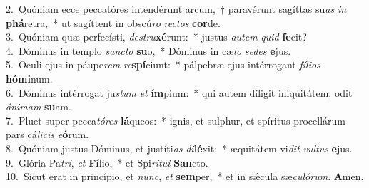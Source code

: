 {2.~}Quóniam ecce peccatóres intendérunt arcum,~† paravérunt sagíttas su\textit{as} \textit{in} \textbf{phá}retra,~* ut sagíttent in obscú\textit{ro} \textit{re}\textit{ctos} \textbf{cor}de.\\
{3.~}Quóniam quæ perfecísti, \textit{de}\textit{stru}\textbf{xé}runt:~* justus \textit{au}\textit{tem} \textit{quid} \textbf{fe}cit?\\
{4.~}Dóminus in templo \textit{san}\textit{cto} \textbf{su}o,~* Dóminus in cæ\textit{lo} \textit{se}\textit{des} \textbf{e}jus.\\
{5.~}Oculi ejus in páupe\textit{rem} \textit{re}\textbf{spí}ciunt:~* pálpebræ ejus intérrogant \textit{fí}\textit{li}\textit{os} \textbf{hó}\textbf{mi}num.\\
{6.~}Dóminus intérrogat ju\textit{stum} \textit{et} \textbf{ím}pium:~* qui autem díligit iniquitátem, odit \textit{á}\textit{ni}\textit{mam} \textbf{su}am.\\
{7.~}Pluet super pecca\textit{tó}\textit{res} \textbf{lá}queos:~* ignis, et sulphur, et spíritus procellárum pars cá\textit{li}\textit{cis} \textit{e}\textbf{ó}rum.\\
{8.~}Quóniam justus Dóminus, et justíti\textit{as} \textit{di}\textbf{lé}xit:~* æquitátem vi\textit{dit} \textit{vul}\textit{tus} \textbf{e}jus.\\
{9.~}Glória Pa\textit{tri}, \textit{et} \textbf{Fí}lio,~* et Spi\textit{rí}\textit{tu}\textit{i} \textbf{San}cto.\\
{10.~}Sicut erat in princípio, et \textit{nunc}, \textit{et} \textbf{sem}per,~* et in sǽcula sæ\textit{cu}\textit{ló}\textit{rum}. \textbf{A}men.\\
